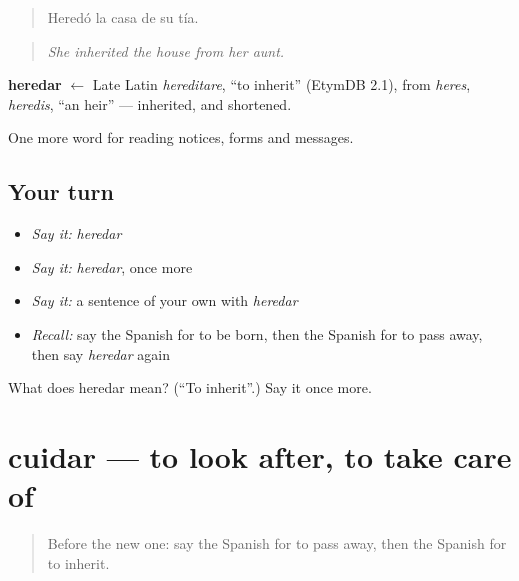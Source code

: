 \begin{quote}
Heredó la casa de su tía.
\end{quote}

\begin{quote}
\emph{She inherited the house from her aunt.}
\end{quote}

\begin{cousinweb}
\textbf{heredar} $\leftarrow$ Late Latin \emph{hereditare}, \textquotedblleft{}to inherit\textquotedblright{} (EtymDB 2.1), from \emph{heres}, \emph{heredis}, \textquotedblleft{}an heir\textquotedblright{} — inherited, and shortened.
\end{cousinweb}

\begin{grammarlens}[title={What you've built}]
One more word for reading notices, forms and messages.
\end{grammarlens}

\subsection*{Your turn}
\begin{itemize}
\raggedright
  \item \emph{Say it:} \emph{heredar}
  \item \emph{Say it:} \emph{heredar}, once more
  \item \emph{Say it:} a sentence of your own with \emph{heredar}
  \item \emph{Recall:} say the Spanish for to be born, then the Spanish for to pass away, then say \emph{heredar} again
\end{itemize}

\begin{tcolorbox}[breakable,colback=teal!4,colframe=teal!35!black,title={Before you move on}]
What does heredar mean? (\textquotedblleft{}To inherit\textquotedblright{}.) Say it once more.
\end{tcolorbox}
\section[cuidar]{cuidar — to look after, to take care of}

\label{lesson:ES-C497-cuidar}



\begin{quote}
Before the new one: say the Spanish for to pass away, then the Spanish for to inherit.
\end{quote}

